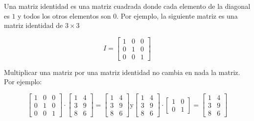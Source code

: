 
Una matriz identidad es una matriz cuadrada donde cada elemento de la diagonal es $1$ y todos los otros elementos son $0$. Por ejemplo, la siguiente matriz es una matriz identidad de $3\times 3$

$$
I = \begin{bmatrix}
	 1 & 0 & 0 \\
	 0 & 1 & 0 \\
	 0 & 0 & 1
\end{bmatrix}$$

Multiplicar una matriz por una matriz identidad no cambia en nada la matriz. Por ejemplo:

$$
 \begin{bmatrix}
	1 & 0 & 0 \\
	0 & 1 & 0 \\
	0 & 0 & 1
\end{bmatrix}  \cdot
\begin{bmatrix}
 1 & 4 \\
 3 & 9 \\
 8 & 6
\end{bmatrix} =
\begin{bmatrix}
	1 & 4 \\
	3 & 9 \\
	8 & 6
\end{bmatrix} \text{y} 
\begin{bmatrix}
	1 & 4 \\
	3 & 9 \\
	8 & 6
\end{bmatrix}
  \cdot
  \begin{bmatrix}
 	1 & 0 \\
 	0 & 1 
 \end{bmatrix}
 =
\begin{bmatrix}
	1 & 4 \\
	3 & 9 \\
	8 & 6
\end{bmatrix}$$ 